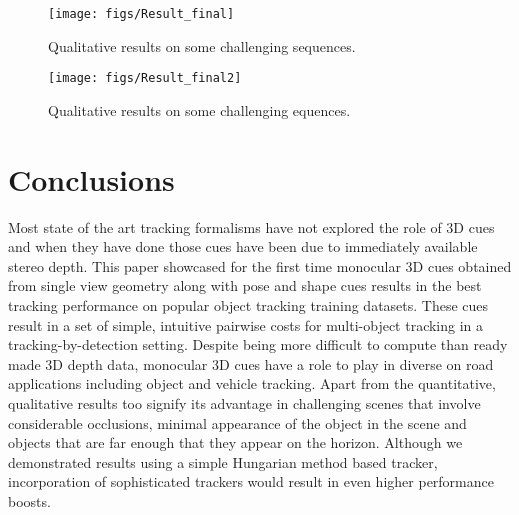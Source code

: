 \documentclass[letterpaper, 10 pt, conference]{ieeeconf}
\begin{document}
\begin{figure*}[!t]
\centering
\texttt{[image: figs/Result\_final]}
\caption{Qualitative results on some challenging sequences.}
\label{fig:qualitative}
\end{figure*}

\begin{figure*}[!t]
\centering
\texttt{[image: figs/Result\_final2]}
\caption{Qualitative results on some challenging equences.}
\label{fig:qualitative2}
\end{figure*}


\section{Conclusions}

Most state of the art tracking formalisms have not explored the role of 3D cues and when they have done those cues have been due to immediately available stereo depth. This paper showcased for the first time monocular 3D cues obtained from single view geometry along with pose and shape cues results in the best tracking performance on popular object tracking training datasets. These cues result in a set of simple, intuitive pairwise costs for multi-object tracking in a tracking-by-detection setting. Despite being more difficult to compute than ready made 3D depth data, monocular 3D cues have a role to play in diverse on road applications including object and vehicle tracking. Apart from the quantitative,  qualitative  results too signify its advantage in challenging scenes that involve considerable occlusions, minimal appearance of the object in the scene and objects that are far enough that they appear on the horizon. Although we demonstrated results using a simple Hungarian method based tracker, incorporation of sophisticated trackers would result in even higher performance boosts. 








\end{document}
